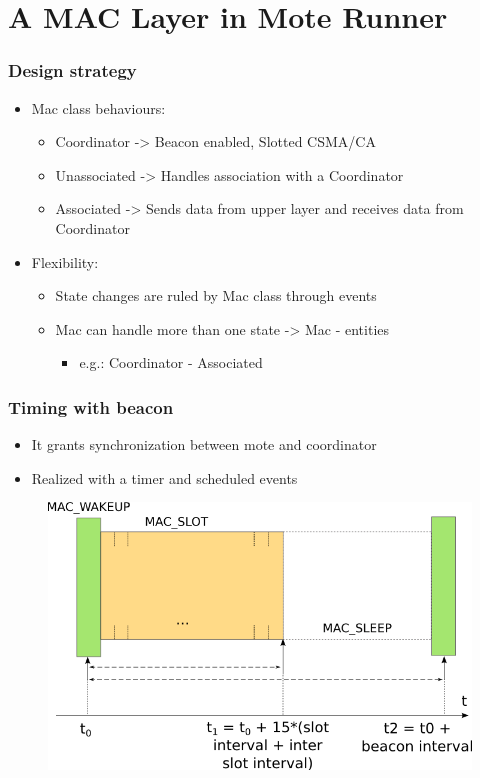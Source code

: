 \section{A MAC Layer in Mote Runner}
\begin{frame}[fragile]
  \frametitle{Design strategy}
  \begin{itemize}
    \item Mac class behaviours:
    \begin{itemize}
      \item Coordinator -> Beacon enabled, Slotted CSMA/CA
      \item Unassociated -> Handles association with a Coordinator
      \item Associated -> Sends data from upper layer and receives data from Coordinator
    \end{itemize}
    \item Flexibility:
    \begin{itemize}
    	\item State changes are ruled by Mac class through events
    	\item Mac can handle more than one state -> Mac - entities
    	\begin{itemize}
	  \item e.g.: Coordinator - Associated
    	\end{itemize}

    \end{itemize}
  \end{itemize}
\end{frame}

\begin{frame}[fragile]
  \frametitle{Timing with beacon}
  \begin{itemize}
    \item It grants synchronization between mote and coordinator
    \item Realized with a timer and scheduled events
  \end{itemize}
  \begin{figure}
    \centering
    \includegraphics[width=.7\textwidth]{img/MAC_STATES.png}
  \end{figure}
\end{frame}

